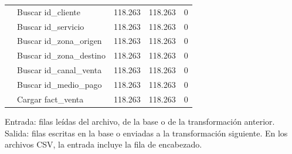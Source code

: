 \begin{table}[!htbp]
\begin{tabularx}{\linewidth}{@{}l>{\raggedright\arraybackslash}Xrrr@{}}
     & Buscar id\_cliente & 118.263 & 118.263 & 0 \\
     & Buscar id\_servicio & 118.263 & 118.263 & 0 \\
     & Buscar id\_zona\_origen & 118.263 & 118.263 & 0 \\
     & Buscar id\_zona\_destino & 118.263 & 118.263 & 0 \\
     & Buscar id\_canal\_venta & 118.263 & 118.263 & 0 \\
     & Buscar id\_medio\_pago & 118.263 & 118.263 & 0 \\
     & Cargar fact\_venta & 118.263 & 118.263 & 0 \\
    \bottomrule
  \end{tabularx}
  \par\smallskip\footnotesize Entrada: filas leídas del archivo, de la base o de la transformación anterior. Salida: filas escritas en la base o enviadas a la transformación siguiente. En los archivos CSV, la entrada incluye la fila de encabezado.
\end{table}
